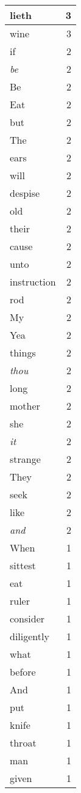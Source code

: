 \begin{center}
\begin{longtable}{l|r}
lieth & 3\\ \hline 
wine & 3\\ \hline 
if & 2\\ \hline 
\emph{be} & 2\\ \hline 
Be & 2\\ \hline 
Eat & 2\\ \hline 
but & 2\\ \hline 
The & 2\\ \hline 
ears & 2\\ \hline 
will & 2\\ \hline 
despise & 2\\ \hline 
old & 2\\ \hline 
their & 2\\ \hline 
cause & 2\\ \hline 
unto & 2\\ \hline 
instruction & 2\\ \hline 
rod & 2\\ \hline 
My & 2\\ \hline 
Yea & 2\\ \hline 
things & 2\\ \hline 
\emph{thou} & 2\\ \hline 
long & 2\\ \hline 
mother & 2\\ \hline 
she & 2\\ \hline 
\emph{it} & 2\\ \hline 
strange & 2\\ \hline 
They & 2\\ \hline 
seek & 2\\ \hline 
like & 2\\ \hline 
\emph{and} & 2\\ \hline 
When & 1\\ \hline 
sittest & 1\\ \hline 
eat & 1\\ \hline 
ruler & 1\\ \hline 
consider & 1\\ \hline 
diligently & 1\\ \hline 
what & 1\\ \hline 
before & 1\\ \hline 
And & 1\\ \hline 
put & 1\\ \hline 
knife & 1\\ \hline 
throat & 1\\ \hline 
man & 1\\ \hline 
given & 1\\ \hline 

\end{longtable}
\end{center}
